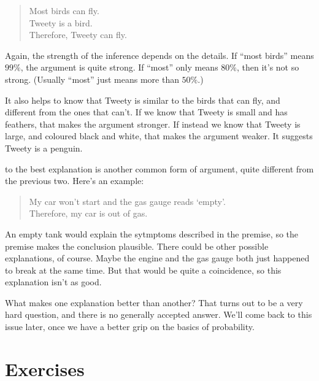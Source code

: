 \documentclass[justified]{tufte-book}
\newenvironment{argument}{\begin{quote}\normalsize}{\end{quote}}
\theoremstyle{definition}
\theoremstyle{definition}
\theoremstyle{definition}
\theoremstyle{remark}
\begin{document}
\begin{argument}
Most birds can fly.\\
Tweety is a bird.\\
Therefore, Tweety can fly.
\end{argument}

Again, the strength of the inference depends on the details. If ``most
birds'' means \(99\%\), the argument is quite strong. If ``most'' only
means \(80\%\), then it's not so strong. (Usually ``most'' just means
more than \(50\%\).)

It also helps to know that Tweety is similar to the birds that can fly,
and different from the ones that can't. If we know that Tweety is small
and has feathers, that makes the argument stronger. If instead we know
that Tweety is large, and coloured black and white, that makes the
argument weaker. It suggests Tweety is a penguin.

 to the best explanation is another common form of
argument, quite different from the previous two. Here's an example:

\begin{argument}
My car won't start and the gas gauge reads `empty'.\\
Therefore, my car is out of gas.
\end{argument}

An empty tank would explain the sytmptoms described in the premise, so
the premise makes the conclusion plausible. There could be other
possible explanations, of course. Maybe the engine and the gas gauge
both just happened to break at the same time. But that would be quite a
coincidence, so this explanation isn't as good.

What makes one explanation better than another? That turns out to be a
very hard question, and there is no generally accepted answer. We'll
come back to this issue later, once we have a better grip on the basics
of probability.

\hypertarget{exercises-1}{%
\section*{Exercises}\label{exercises-1}}
\end{document}
